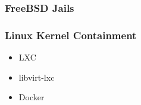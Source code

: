 \subsubsection{FreeBSD Jails}

\subsubsection{Linux Kernel Containment}

\begin{itemize}

\item LXC

\item libvirt-lxc

\item Docker

\end{itemize}

